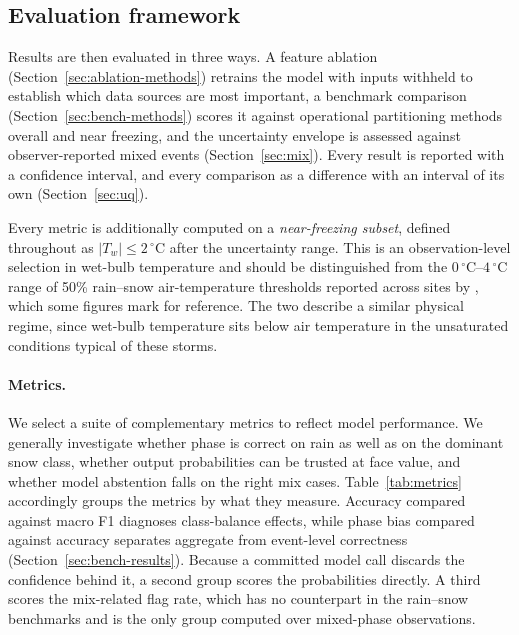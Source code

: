 \documentclass[twocol]{ametsocV6.1} %
\newcommand{\degC}[1]{\ensuremath{#1\,^{\circ}\mathrm{C}}}
\begin{document}
\subsection{Evaluation framework}
\label{sec:eval-framework}
Results are then evaluated in three ways. A feature ablation
(Section~\ref{sec:ablation-methods}) retrains the model with inputs
withheld to establish which data sources are most important, a benchmark
comparison (Section~\ref{sec:bench-methods}) scores it against
operational partitioning methods overall and near freezing, and the
uncertainty envelope is assessed against observer-reported mixed events
(Section~\ref{sec:mix}). Every result is reported with a confidence
interval, and every comparison as a difference with an interval of its
own (Section~\ref{sec:uq}).

Every metric is additionally computed on a \emph{near-freezing subset},
defined throughout as $|T_w| \le \degC{2}$ after the \citet{sims2015}
uncertainty range. This is an observation-level selection in wet-bulb
temperature and should be distinguished from the \degC{0}--\degC{4}
range of 50\% rain--snow air-temperature thresholds reported across
sites by \citet{jennings2018spatial}, which some figures mark for
reference. The two describe a similar physical regime, since
wet-bulb temperature sits below air temperature in the unsaturated
conditions typical of these storms.

\paragraph{Metrics.}
We select a suite of complementary metrics to reflect model performance. 
We generally investigate whether phase is correct on rain as well as on the 
dominant snow class, whether output probabilities can be trusted at
face value, and whether model abstention falls on the right mix cases.
Table~\ref{tab:metrics} accordingly groups the metrics by what they
measure. Accuracy compared against macro F1 diagnoses class-balance
effects, while phase bias compared against accuracy separates aggregate
from event-level correctness (Section~\ref{sec:bench-results}). Because
a committed model call discards the confidence behind it, a second group
scores the probabilities directly. A third scores the mix-related flag
rate, which has no counterpart in the rain--snow benchmarks and is the
only group computed over mixed-phase observations.
\end{document}
